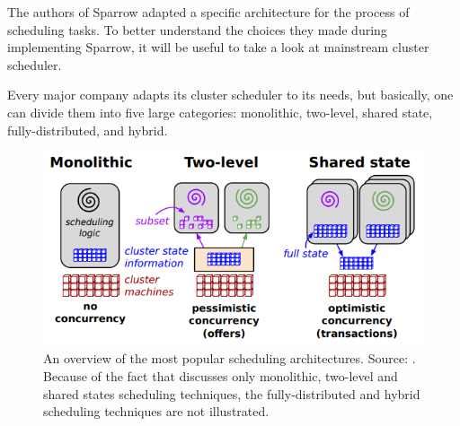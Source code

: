\documentclass[11pt]{article}
\begin{document}
	The authors of Sparrow adapted a specific architecture for the process of scheduling tasks. To better understand the choices they made during implementing Sparrow, it will be useful to take a look at mainstream cluster scheduler.
    
	Every major company adapts its cluster scheduler to its needs, but basically, one can divide them into five large categories: monolithic, two-level, shared state, fully-distributed, and hybrid. %
    
    \begin{figure}
    	\includegraphics[scale=.6]{architectures}
        \caption{An overview of the most popular scheduling architectures. Source: \cite{omega}. Because of the fact that \cite{omega} discusses only monolithic, two-level and shared states scheduling techniques, the fully-distributed and hybrid scheduling techniques are not illustrated.}
    \end{figure}
\end{document}
